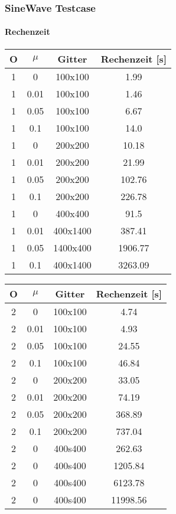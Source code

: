 \documentclass[
	11pt, %
	aspectratio=169, %
]{beamer}
\begin{document}
\begin{frame}
	\frametitle{SineWave Testcase}
	\framesubtitle{Rechenzeit}
	\begin{table}[h]
	\begin{tabular*}{0.4\textwidth}{|c|c|c|c|}
		\hline
		O & $\mu$ & Gitter & Rechenzeit [s]\\
		\hline
		1 & 0 & 100x100 & 1.99\\
		\hline
		1 & 0.01 & 100x100 & 1.46\\
		\hline
		1 & 0.05 & 100x100 & 6.67\\
		\hline
		1 & 0.1 & 100x100 & 14.0\\
		\hline
		1 & 0 & 200x200 & 10.18\\
		\hline
		1 & 0.01 & 200x200 & 21.99\\
		\hline
		1 & 0.05 & 200x200 & 102.76\\
		\hline
		1 & 0.1 & 200x200 & 226.78\\
		\hline
		1 & 0 & 400x400 & 91.5\\
		\hline
		1 & 0.01 & 400x1400 & 387.41\\
		\hline
		1 & 0.05 & 1400x400 & 1906.77\\
		\hline
		1 & 0.1 & 400x1400 & 3263.09\\
		\hline
	\end{tabular*}
	\hspace{0.05\textwidth}
	\begin{tabular*}{0.4\textwidth}{@{\extracolsep{\fill}}|c|c|c|c|}
		\hline
		O & $\mu$ & Gitter & Rechenzeit [s]\\
		\hline
		2 & 0 & 100x100 & 4.74\\
		\hline
		2 & 0.01 & 100x100 & 4.93\\
		\hline
		2 & 0.05 & 100x100 & 24.55\\
		\hline
		2 & 0.1 & 100x100 & 46.84\\
		\hline
		2 & 0 & 200x200 & 33.05\\
		\hline
		2 & 0.01 & 200x200 & 74.19\\
		\hline
		2 & 0.05 & 200x200 & 368.89\\
		\hline
		2 & 0.1 & 200x200 & 737.04\\
		\hline
		2 & 0 & 400s400 & 262.63 \\
		\hline
		2 & 0 & 400s400 & 1205.84 \\
		\hline
		2 & 0 & 400s400 & 6123.78 \\
		\hline
		2 & 0 & 400s400 & 11998.56 \\
		\hline
		\end{tabular*}
	\end{table}

\end{frame}
\end{document}
